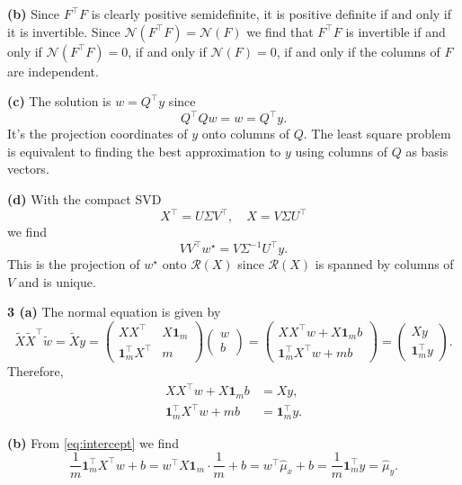 \documentclass{article}
\makeatletter
\newcommand*{\shifttext}[1]{%
  \settowidth{\@tempdima}{#1}%
  \hspace{-\@tempdima}#1%
}
\newcommand{\plabel}[1]{%
\shifttext{\textbf{#1}\quad}%
}
\newcommand{\prule}{%
\begin{center}%
\hdashrule[0.5ex]{.99\linewidth}{1pt}{1pt 2.5pt}%
\end{center}%
}
\makeatother
\begin{document}
\plabel{(b)}%
Since $F^\intercal F$ is clearly positive semidefinite, it is positive definite if and only if it is invertible.
Since $\mathcal{N}(F^\intercal F) = \mathcal{N}(F)$ we find that $F^\intercal F$ is invertible if and only if $\mathcal{N}(F^\intercal F) = \qty{0}$, if and only if $\mathcal{N}(F) = \qty{0}$, if and only if the columns of $F$ are independent.

\plabel{(c)}%
The solution is $w = Q^\intercal y$ since
\[ Q^\intercal Q w = w = Q^\intercal y. \]
It's the projection coordinates of $y$ onto columns of $Q$.
The least square problem is equivalent to finding the best approximation to $y$ using columns of $Q$ as basis vectors.

\plabel{(d)}%
With the compact SVD
\[ X^\intercal = U \Sigma V^\intercal,\quad X = V \Sigma U^\intercal \]
we find
\[ V V^\intercal w^\star = V \Sigma^{-1} U^\intercal y. \]
This is the projection of $w^\star$ onto $\mathcal{R}(X)$ since $\mathcal{R}(X)$ is spanned by columns of $V$ and is unique.

\prule
\plabel{3 (a)}%
The normal equation is given by
\[ \tilde{X} \tilde{X}^\intercal \tilde{w} = \tilde{X} y = \begin{pmatrix}
    X X^\intercal & X \mathbf{1}_m \\
    \mathbf{1}^\intercal_m X^\intercal & m
\end{pmatrix}\begin{pmatrix}
    w \\ b
\end{pmatrix} = \begin{pmatrix}
    XX^\intercal w + X\mathbf{1}_m b \\
    \mathbf{1}^\intercal_m X^\intercal w + mb
\end{pmatrix} = \begin{pmatrix}
    X y \\
    \mathbf{1}_m^\intercal y
\end{pmatrix}. \]
Therefore,
\begin{align}
    \label{eq:slope}XX^\intercal w + X\mathbf{1}_m b &= X y, \\
    \label{eq:intercept}\mathbf{1}^\intercal_m X^\intercal w + mb &= \mathbf{1}_m^\intercal y.
\end{align}

\plabel{(b)}%
From \cref{eq:intercept} we find
\begin{equation}
    \label{eq:mean}\frac{1}{m}\mathbf{1}^\intercal_m X^\intercal w + b = w^\intercal X \mathbf{1}_m\cdot \frac{1}{m} + b = w^\intercal \hat{\mu}_x + b = \frac{1}{m}\mathbf{1}_m^\intercal y = \hat{\mu}_y.
\end{equation}
\end{document}
